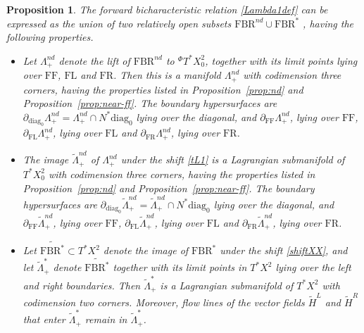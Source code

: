 \documentclass[10pt, a4paper, twoside]{amsart}
\numberwithin{equation}{section}
\newtheorem{proposition}[theorem]{Proposition}
\theoremstyle{remark}
\begin{document}
\begin{proposition}\label{prop:flowout-structure}
The forward bicharacteristic relation \eqref{Lambda1def} 
can be expressed as the union of two relatively open subsets ${\mathrm{FBR}}^{nd} \cup {\mathrm{FBR}}^*$ , having the following properties. 
\begin{itemize}
\item Let $\Lambda_+^{nd}$ denote the lift of ${\mathrm{FBR}}^{nd}$ to ${}^\Phi T^* X^2_0$, together with its limit points lying over ${\mathrm{FF}}$, ${\mathrm{FL}}$ and ${\mathrm{FR}}$. 
Then this is a manifold $\Lambda_+^{nd}$ with codimension three corners, having the properties listed in Proposition~\ref{prop:nd} and Proposition~\ref{prop:near-ff}. The boundary hypersurfaces are  $\partial_{\mathrm{diag}_0} \Lambda_+^{nd} = \Lambda_+^{nd} \cap N^* {\mathrm{diag}_0}$ lying over the diagonal, and $\partial_{\mathrm{FF}}\Lambda_+^{nd}$, lying over ${\mathrm{FF}}$,  $\partial_{\mathrm{FL}}\Lambda_+^{nd}$, lying over ${\mathrm{FL}}$ and $\partial_{\mathrm{FR}}\Lambda_+^{nd}$, lying over ${\mathrm{FR}}$. 

\item The image ${\tilde \Lambda}_+^{nd}$ of $\Lambda_+^{nd}$ under the shift \eqref{tL1}  is a Lagrangian submanifold of $T^* X^2_0$ with codimension three corners, having the properties listed in Proposition~\ref{prop:nd} and Proposition~\ref{prop:near-ff}. The boundary hypersurfaces are $\partial_{\mathrm{diag}_0} {\tilde \Lambda}_+^{nd} = {\tilde \Lambda}_+^{nd} \cap N^* {\mathrm{diag}_0}$ lying over the diagonal, and $\partial_{\mathrm{FF}}{\tilde \Lambda}_+^{nd}$, lying over ${\mathrm{FF}}$,  $\partial_{\mathrm{FL}}{\tilde \Lambda}_+^{nd}$, lying over ${\mathrm{FL}}$ and $\partial_{\mathrm{FR}}{\tilde \Lambda}_+^{nd}$, lying over ${\mathrm{FR}}$. 

\item Let $\widetilde{{\mathrm{FBR}}^*} \subset T^* X^2$ denote the image of ${\mathrm{FBR}}^*$ under the shift \eqref{shiftXX}, and let ${\tilde \Lambda}_+^*$ denote $\widetilde{{\mathrm{FBR}}^*}$ together with its limit points in $T^* X^2$ lying over the left and right boundaries. Then ${\tilde \Lambda}_+^*$ 
 is a Lagrangian submanifold of $T^* X^2$  with codimension two corners. Moreover, flow lines of the vector fields ${\tilde H^L}$ and ${\tilde H^R}$ that enter ${\tilde \Lambda}_+^*$ remain in ${\tilde \Lambda}_+^*$.  
\end{itemize}

\end{proposition}
 
\end{document}
